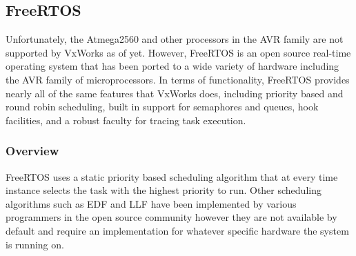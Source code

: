 \documentclass{article}
\begin{document}
\subsection{FreeRTOS}

Unfortunately, the Atmega2560 and other processors in the AVR family are not supported by VxWorks as of yet. However, FreeRTOS is an open source real-time operating system that has been ported to a wide variety of hardware including the AVR family of microprocessors. In terms of functionality, FreeRTOS provides nearly all of the same features that VxWorks does, including priority based and round robin scheduling, built in support for semaphores and queues, hook facilities, and a robust faculty for tracing task execution.

\subsubsection{Overview}

FreeRTOS uses a static priority based scheduling algorithm that at every time instance selects the task with the highest priority to run. Other scheduling algorithms such as EDF and LLF have been implemented by various programmers in the open source community however they are not available by default and require an implementation for whatever specific hardware the system is running on.
\end{document}
